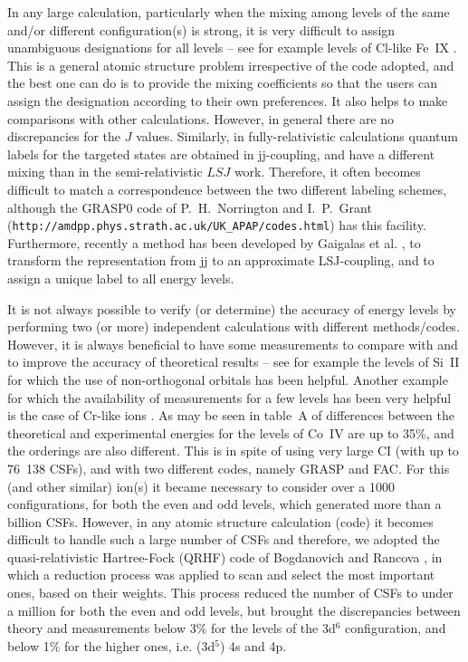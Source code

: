 \documentclass[fleqn]{article}
\begin{document}
In any large calculation, particularly when the mixing among levels of the same and/or different configuration(s)  is strong, it is very difficult to assign  unambiguous designations for all levels --    see for example levels of Cl-like Fe~IX \cite{fe9}. This is a general atomic structure problem irrespective of the code adopted, and the best one can do is to provide the mixing coefficients so that the users can assign the designation according to their own preferences. It also helps to make comparisons with other calculations.  However, in general there are no discrepancies for the $J$ values. Similarly, in fully-relativistic calculations quantum labels for the targeted states are obtained in jj-coupling, and have a different mixing than in the semi-relativistic $LSJ$ work. Therefore, it often becomes difficult to match a correspondence between the two different labeling schemes, although the GRASP0 code of P.~H.~Norrington and I.~P.~Grant ({\tt http://amdpp.phys.strath.ac.uk/UK\_APAP/codes.html}) has this facility. Furthermore, recently a method has been developed by Gaigalas et al.  \cite{gag}, to transform the representation from jj to an approximate  LSJ-coupling, and to assign a unique label to all energy levels. 

It is not always possible to verify (or determine) the accuracy of energy levels by performing two (or more) independent calculations with different methods/codes. However, it is always beneficial to have some measurements to compare with and to improve the accuracy of theoretical results  -- see for example the levels of Si~II \cite{sstsi2} for which the use of non-orthogonal orbitals has been helpful. Another example for which the availability of measurements for a few levels has been very helpful is the case of Cr-like ions \cite{crlike1, crlike2}. As may be seen in table~A of \cite{crlike1} differences between the theoretical and experimental energies for the levels of Co~IV are up to 35\%, and the orderings are also different. This is in spite of using very large CI (with up to 76~138 CSFs), and with two different codes, namely GRASP and FAC.  For this (and other similar) ion(s) it became necessary to  consider over a 1000 configurations, for both the even and odd levels, which generated more than a billion CSFs. However, in any atomic structure calculation (code) it becomes difficult to handle such a large number of CSFs and therefore, we adopted the quasi-relativistic Hartree-Fock (QRHF) code of Bogdanovich and Rancova \cite{qr1, qr2}, in which  a reduction process was applied to scan and select the most important ones, based on their weights. This process reduced the number of CSFs to under a million for both the even and odd levels, but brought the discrepancies between theory and measurements below 3\% for the levels of the 3d$^6$ configuration, and below 1\% for the higher ones, i.e. (3d$^5$) 4s and 4p. 
\end{document}
